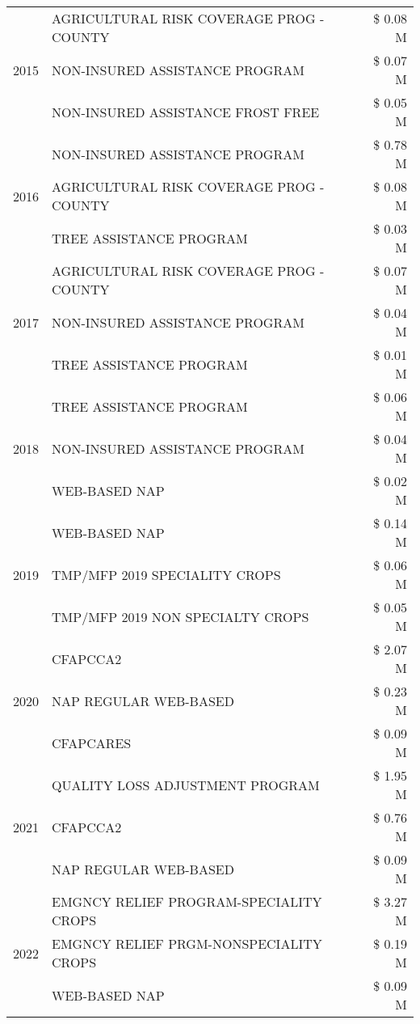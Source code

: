 \begin{tabular}{llr}
\cline{1-3}
\multirow[t]{3}{*}{2015} & AGRICULTURAL RISK COVERAGE PROG - COUNTY & \$ 0.08 M \\
 & NON-INSURED ASSISTANCE PROGRAM & \$ 0.07 M \\
 & NON-INSURED ASSISTANCE FROST FREE & \$ 0.05 M \\
\cline{1-3}
\multirow[t]{3}{*}{2016} & NON-INSURED ASSISTANCE PROGRAM & \$ 0.78 M \\
 & AGRICULTURAL RISK COVERAGE PROG - COUNTY & \$ 0.08 M \\
 & TREE ASSISTANCE PROGRAM & \$ 0.03 M \\
\cline{1-3}
\multirow[t]{3}{*}{2017} & AGRICULTURAL RISK COVERAGE PROG - COUNTY & \$ 0.07 M \\
 & NON-INSURED ASSISTANCE PROGRAM & \$ 0.04 M \\
 & TREE ASSISTANCE PROGRAM & \$ 0.01 M \\
\cline{1-3}
\multirow[t]{3}{*}{2018} & TREE ASSISTANCE PROGRAM & \$ 0.06 M \\
 & NON-INSURED ASSISTANCE PROGRAM & \$ 0.04 M \\
 & WEB-BASED NAP & \$ 0.02 M \\
\cline{1-3}
\multirow[t]{3}{*}{2019} & WEB-BASED NAP & \$ 0.14 M \\
 & TMP/MFP 2019 SPECIALITY CROPS & \$ 0.06 M \\
 & TMP/MFP 2019 NON SPECIALTY CROPS & \$ 0.05 M \\
\cline{1-3}
\multirow[t]{3}{*}{2020} & CFAPCCA2 & \$ 2.07 M \\
 & NAP REGULAR WEB-BASED & \$ 0.23 M \\
 & CFAPCARES & \$ 0.09 M \\
\cline{1-3}
\multirow[t]{3}{*}{2021} & QUALITY LOSS ADJUSTMENT PROGRAM & \$ 1.95 M \\
 & CFAPCCA2 & \$ 0.76 M \\
 & NAP REGULAR WEB-BASED & \$ 0.09 M \\
\cline{1-3}
\multirow[t]{3}{*}{2022} & EMGNCY RELIEF PROGRAM-SPECIALITY CROPS & \$ 3.27 M \\
 & EMGNCY RELIEF PRGM-NONSPECIALITY CROPS & \$ 0.19 M \\
 & WEB-BASED NAP & \$ 0.09 M \\
\cline{1-3}
\bottomrule
\end{tabular}
